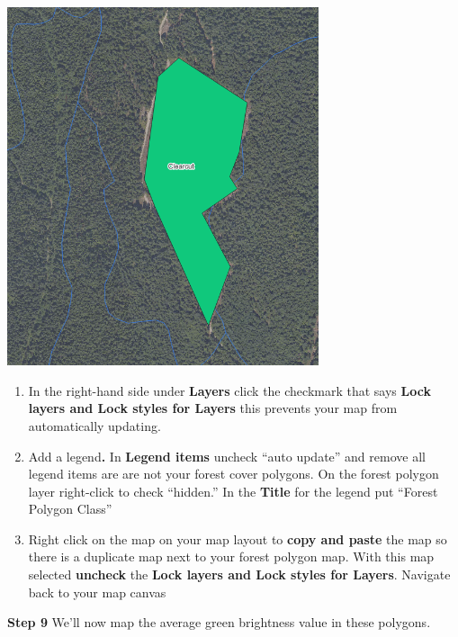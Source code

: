 \documentclass[
  letterpaper,
]{book}
\begin{document}
\includegraphics[width=3.60417in,height=\textheight]{images/clipboard-1857806976.png}

\begin{enumerate}
\def\labelenumi{\Alph{enumi}.}
\setcounter{enumi}{7}
\item
  In the right-hand side under \textbf{Layers} click the checkmark that
  says \textbf{Lock layers and Lock styles for Layers} this prevents
  your map from automatically updating.
\item
  Add a legend\textbf{.} In \textbf{Legend items} uncheck ``auto
  update'' and remove all legend items are are not your forest cover
  polygons. On the forest polygon layer right-click to check ``hidden.''
  In the \textbf{Title} for the legend put ``Forest Polygon Class''
\item
  Right click on the map on your map layout to \textbf{copy and paste}
  the map so there is a duplicate map next to your forest polygon map.
  With this map selected \textbf{uncheck} the \textbf{Lock layers and
  Lock styles for Layers}. Navigate back to your map canvas
\end{enumerate}

\textbf{Step 9} We'll now map the average green brightness value in
these polygons.
\end{document}
